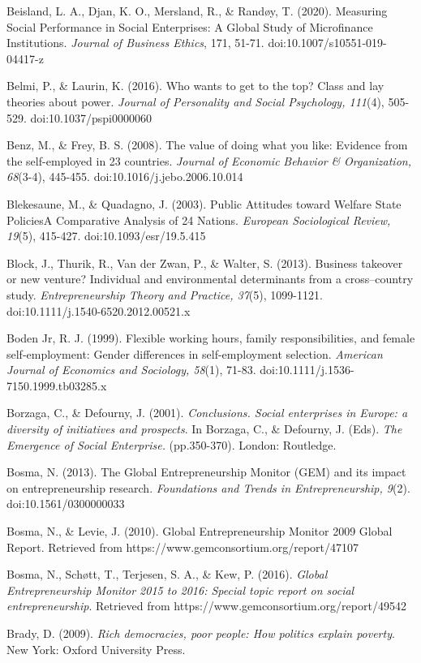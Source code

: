 \documentclass{article}
\begin{document}
Beisland, L. A., Djan, K. O., Mersland, R., \& Randøy, T. (2020). Measuring Social Performance in Social Enterprises: A Global Study of Microfinance Institutions. \emph{Journal of Business Ethics}, 171, 51-71. doi:10.1007/s10551-019-04417-z

Belmi, P., \& Laurin, K. (2016). Who wants to get to the top? Class and lay theories about power. \emph{Journal of Personality and Social Psychology, 111}(4), 505-529. doi:10.1037/pspi0000060

Benz, M., \& Frey, B. S. (2008). The value of doing what you like: Evidence from the self-employed in 23 countries. \emph{Journal of Economic }\emph{Behavior}\emph{ \& Organization, 68}(3-4), 445-455. doi:10.1016/j.jebo.2006.10.014

Blekesaune, M., \& Quadagno, J. (2003). Public Attitudes toward Welfare State PoliciesA Comparative Analysis of 24 Nations. \emph{European Sociological Review, 19}(5), 415-427. doi:10.1093/esr/19.5.415

Block, J., Thurik, R., Van der Zwan, P., \& Walter, S. (2013). Business takeover or new venture? Individual and environmental determinants from a cross--country study. \emph{Entrepreneurship Theory and Practice, 37}(5), 1099-1121. doi:10.1111/j.1540-6520.2012.00521.x

Boden Jr, R. J. (1999). Flexible working hours, family responsibilities, and female self-employment: Gender differences in self-employment selection. \emph{American Journal of Economics and Sociology, 58}(1), 71-83. doi:10.1111/j.1536-7150.1999.tb03285.x

Borzaga, C., \& Defourny, J. (2001). \emph{Conclusions. Social enterprises in Europe: a diversity of initiatives and prospects}. In Borzaga, C., \& Defourny, J. (Eds). \emph{The Emergence of Social Enterprise. }(pp.350-370). London: Routledge.

Bosma, N. (2013). The Global Entrepreneurship Monitor (GEM) and its impact on entrepreneurship research. \emph{Foundations and Trends in Entrepreneurship, 9}(2). doi:10.1561/0300000033

Bosma, N., \& Levie, J. (2010). Global Entrepreneurship Monitor 2009 Global Report. Retrieved from https://www.gemconsortium.org/report/47107

Bosma, N., Schøtt, T., Terjesen, S. A., \& Kew, P. (2016). \emph{Global Entrepreneurship Monitor 2015 to 2016: Special topic report on social entrepreneurship}. Retrieved from https://www.gemconsortium.org/report/49542

Brady, D. (2009). \emph{Rich democracies, poor people: How politics explain poverty}. New York: Oxford University Press.
\end{document}
